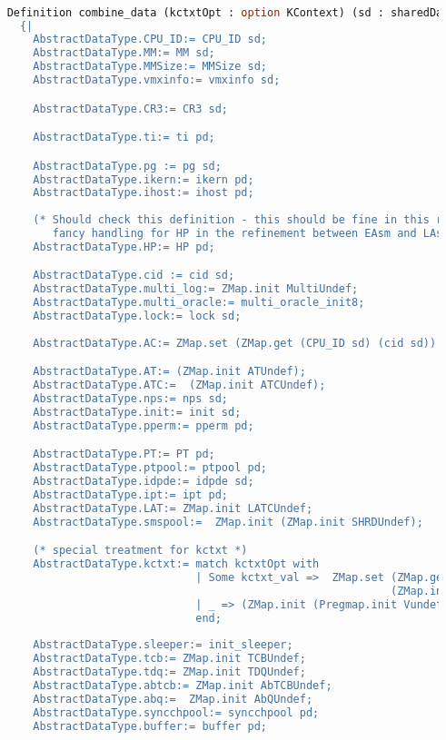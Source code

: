 \begin{lstlisting}[language=Caml]

    Definition combine_data (kctxtOpt : option KContext) (sd : sharedData) (pd: privData) : AbstractDataType.RData :=
      {|
        AbstractDataType.CPU_ID:= CPU_ID sd;
        AbstractDataType.MM:= MM sd;
        AbstractDataType.MMSize:= MMSize sd;
        AbstractDataType.vmxinfo:= vmxinfo sd;

        AbstractDataType.CR3:= CR3 sd;

        AbstractDataType.ti:= ti pd;

        AbstractDataType.pg := pg sd;
        AbstractDataType.ikern:= ikern pd;
        AbstractDataType.ihost:= ihost pd;
        
        (* Should check this definition - this should be fine in this relation - we may need 
           fancy handling for HP in the refinement between EAsm and LAsm *)
        AbstractDataType.HP:= HP pd;

        AbstractDataType.cid := cid sd;
        AbstractDataType.multi_log:= ZMap.init MultiUndef;
        AbstractDataType.multi_oracle:= multi_oracle_init8;
        AbstractDataType.lock:= lock sd;
        
        AbstractDataType.AC:= ZMap.set (ZMap.get (CPU_ID sd) (cid sd)) (AC pd) (ZMap.init Container_unused); 

        AbstractDataType.AT:= (ZMap.init ATUndef);
        AbstractDataType.ATC:=  (ZMap.init ATCUndef);
        AbstractDataType.nps:= nps sd;
        AbstractDataType.init:= init sd;
        AbstractDataType.pperm:= pperm pd;

        AbstractDataType.PT:= PT pd;
        AbstractDataType.ptpool:= ptpool pd;
        AbstractDataType.idpde:= idpde sd;
        AbstractDataType.ipt:= ipt pd;
        AbstractDataType.LAT:= ZMap.init LATCUndef;
        AbstractDataType.smspool:=  ZMap.init (ZMap.init SHRDUndef);

        (* special treatment for kctxt *)
        AbstractDataType.kctxt:= match kctxtOpt with 
                                 | Some kctxt_val =>  ZMap.set (ZMap.get (CPU_ID sd) (cid sd)) kctxt_val 
                                                               (ZMap.init (Pregmap.init Vundef))
                                 | _ => (ZMap.init (Pregmap.init Vundef))
                                 end;
        
        AbstractDataType.sleeper:= init_sleeper;
        AbstractDataType.tcb:= ZMap.init TCBUndef;
        AbstractDataType.tdq:= ZMap.init TDQUndef;
        AbstractDataType.abtcb:= ZMap.init AbTCBUndef;
        AbstractDataType.abq:=  ZMap.init AbQUndef;
        AbstractDataType.syncchpool:= syncchpool pd;
        AbstractDataType.buffer:= buffer pd;
        

\end{lstlisting}

